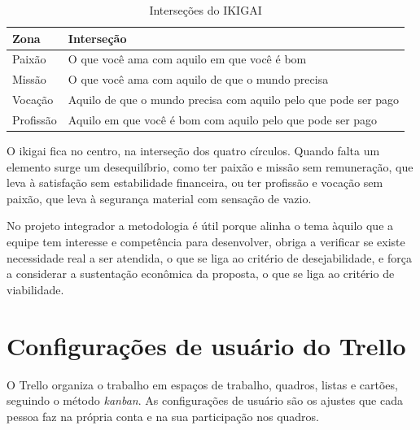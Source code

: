 \documentclass[11pt]{ifscarticle}
\begin{document}
\begin{table}[htb]
\centering
\caption{Interseções do IKIGAI}
\label{tab:ikigai}
\begin{tabular}{|l|p{8.0cm}|}
\hline
\textbf{Zona} & \textbf{Interseção} \\ \hline
Paixão & O que você ama com aquilo em que você é bom \\ \hline
Missão & O que você ama com aquilo de que o mundo precisa \\ \hline
Vocação & Aquilo de que o mundo precisa com aquilo pelo que pode ser pago \\ \hline
Profissão & Aquilo em que você é bom com aquilo pelo que pode ser pago \\ \hline
\end{tabular}
\end{table}

O ikigai fica no centro, na interseção dos quatro círculos. Quando falta um
elemento surge um desequilíbrio, como ter paixão e missão sem remuneração,
que leva à satisfação sem estabilidade financeira, ou ter profissão e
vocação sem paixão, que leva à segurança material com sensação de vazio.

No projeto integrador a metodologia é útil porque alinha o tema àquilo que a
equipe tem interesse e competência para desenvolver, obriga a verificar se
existe necessidade real a ser atendida, o que se liga ao critério de
desejabilidade, e força a considerar a sustentação econômica da proposta, o
que se liga ao critério de viabilidade.

\section{Configurações de usuário do Trello}

O Trello organiza o trabalho em espaços de trabalho, quadros, listas e
cartões, seguindo o método \textit{kanban}. As configurações de usuário são
os ajustes que cada pessoa faz na própria conta e na sua participação nos
quadros.
\end{document}
